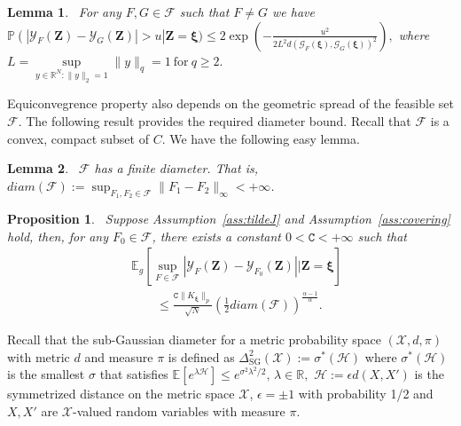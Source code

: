 \documentclass[11pt,leqno]{amsart}
\newtheorem{lemma}{Lemma}
\newtheorem{proposition}{Proposition}
\begin{document}
\begin{lemma}~\label{lem:sub-gauss}
For any $F, G \in \mathcal{F}$ such that $F\neq G$ we have 
\(
    \mathbb P \left( \left| \mathcal{Y}_{F}(\mathbf{Z}) - \mathcal{Y}_G(\mathbf{Z})\right| > u \right | \mathbf Z =  \boldsymbol\xi ) \leq 2 \exp \left( - \frac{u^2}{2 L^2 d(\mathcal{G}_F( \boldsymbol\xi ),\mathcal{G}_G( \boldsymbol\xi ))^2} \right),
\)
where 
 \(   L = \underset{y \in \mathbb R^N : \|y\|_{2} = 1}{\sup} \|y\|_{q} = 1 ~\text{for}~q \geq 2.\)
\end{lemma}

Equiconvegrence property also depends on the geometric spread of the feasible set $\mathcal{F}$. The following result provides the required diameter bound. Recall that $\mathcal F$ is a convex, compact subset of $C$. 
We have the following easy lemma.
\begin{lemma}~\label{ass:diameter}
    $\mathcal{F}$ has a finite diameter. That is, $diam(\mathcal F) := \sup_{F_1, F_2 \in \mathcal{F}} \|F_1 - F_2\|_\infty < +\infty$.
\end{lemma}

\begin{proposition}~\label{thm:gauss-complex}
Suppose Assumption~\ref{ass:tildeJ} and Assumption~\ref{ass:covering} hold, then, for any $F_0 \in \mathcal F$, there exists a constant $0 < \mathtt{C} < +\infty$ such that
\begin{align}~\label{eq:gauss-complex1}
    &\mathbb E_{g} \left[ \sup_{F \in \mathcal F} |\mathcal{Y}_F(\mathbf Z) - \mathcal{Y}_{F_0}(\mathbf Z)| \bigg | \mathbf Z =  \boldsymbol\xi  \right] \\\nonumber&\qquad\leq \frac{ \mathtt{C} \|K_{ \boldsymbol\xi }\|_{p}}{\sqrt{N}} \left(\frac{1}{2} diam(\mathcal F) \right)^{\frac{\alpha-1}{\alpha}}.%
\end{align}
\end{proposition}


\newcommand{\dsg}{\Delta_{\text{SG}}}
Recall that the sub-Gaussian diameter for a metric probability space $(\mathcal{X}, d,\pi)$ with metric $d$ and measure $\pi$ is defined as $\dsg^2(\mathcal{X}) := \sigma^*(\mathcal{H})$ where $\sigma^*(\mathcal{H})$ is the smallest $\sigma$ that satisfies 
\(
    \mathbb E \left[e^{\lambda \mathcal{H}} \right]\leq e^{\sigma^2\lambda^2/2},\,\lambda\in\mathbb R,
\)
$\mathcal{H}:= \epsilon d(X,X')$ is the symmetrized distance on the metric space $\mathcal{X}$, $\epsilon = \pm 1$ with probability 1/2 and $X,X'$ are $\mathcal{X}$-valued random variables with measure $\pi$. 
\end{document}
